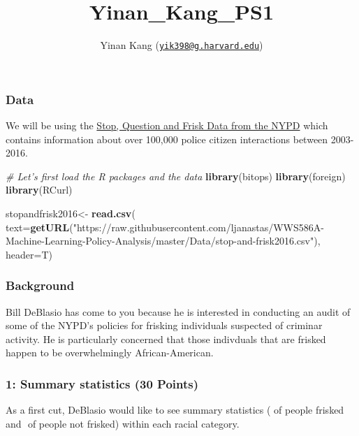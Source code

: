 \documentclass[]{article}
\title{Yinan\_Kang\_PS1}
\author{Yinan Kang
(\href{mailto:yik398@g.harvard.edu}{\nolinkurl{yik398@g.harvard.edu}})}
\date{}
\newenvironment{Shaded}{\begin{snugshade}}{\end{snugshade}}
\newcommand{\CommentTok}[1]{\textcolor[rgb]{0.56,0.35,0.01}{\textit{#1}}}
\newcommand{\DataTypeTok}[1]{\textcolor[rgb]{0.13,0.29,0.53}{#1}}
\newcommand{\KeywordTok}[1]{\textcolor[rgb]{0.13,0.29,0.53}{\textbf{#1}}}
\newcommand{\NormalTok}[1]{#1}
\newcommand{\StringTok}[1]{\textcolor[rgb]{0.31,0.60,0.02}{#1}}
\begin{document}
\maketitle

\hypertarget{data}{%
\subsubsection{Data}\label{data}}

We will be using the
\href{https://www1.nyc.gov/site/nypd/stats/reports-analysis/stopfrisk.page}{Stop,
Question and Frisk Data from the NYPD} which contains information about
over 100,000 police citizen interactions between 2003-2016.

\begin{Shaded}
\begin{Highlighting}[]
\CommentTok{# Let's first load the R packages and the data}
\KeywordTok{library}\NormalTok{(bitops)}
\KeywordTok{library}\NormalTok{(foreign)}
\KeywordTok{library}\NormalTok{(RCurl)}


\NormalTok{stopandfrisk2016<-}
\StringTok{  }\KeywordTok{read.csv}\NormalTok{(}
    \DataTypeTok{text=}\KeywordTok{getURL}\NormalTok{(}\StringTok{"https://raw.githubusercontent.com/ljanastas/WWS586A-Machine-Learning-Policy-Analysis/master/Data/stop-and-frisk2016.csv"}\NormalTok{),  }
           \DataTypeTok{header=}\NormalTok{T)}
\end{Highlighting}
\end{Shaded}

\hypertarget{background}{%
\subsubsection{Background}\label{background}}

Bill DeBlasio has come to you because he is interested in conducting an
audit of some of the NYPD's policies for frisking individuals suspected
of criminar activity. He is particularly concerned that those indivduals
that are frisked happen to be overwhelmingly African-American.

\hypertarget{summary-statistics-30-points}{%
\subsubsection{1: Summary statistics (30
Points)}\label{summary-statistics-30-points}}

As a first cut, DeBlasio would like to see summary statistics (\(%
\) of people frisked and \(%
\) of people not frisked) within each racial category.
\end{document}
